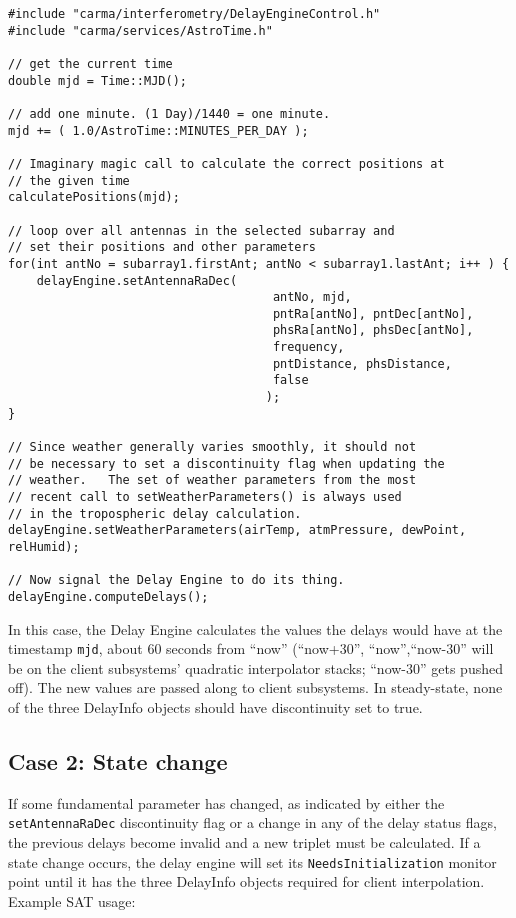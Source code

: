 \documentclass[preprint]{aastex}
\begin{document}
\begin{verbatim}
#include "carma/interferometry/DelayEngineControl.h"
#include "carma/services/AstroTime.h"

// get the current time
double mjd = Time::MJD(); 

// add one minute. (1 Day)/1440 = one minute.
mjd += ( 1.0/AstroTime::MINUTES_PER_DAY );   

// Imaginary magic call to calculate the correct positions at 
// the given time
calculatePositions(mjd);

// loop over all antennas in the selected subarray and
// set their positions and other parameters
for(int antNo = subarray1.firstAnt; antNo < subarray1.lastAnt; i++ ) {
    delayEngine.setAntennaRaDec(
                                     antNo, mjd,
                                     pntRa[antNo], pntDec[antNo],
                                     phsRa[antNo], phsDec[antNo],
                                     frequency, 
                                     pntDistance, phsDistance, 
                                     false
                                    );
}

// Since weather generally varies smoothly, it should not
// be necessary to set a discontinuity flag when updating the
// weather.   The set of weather parameters from the most
// recent call to setWeatherParameters() is always used
// in the tropospheric delay calculation.
delayEngine.setWeatherParameters(airTemp, atmPressure, dewPoint, relHumid);

// Now signal the Delay Engine to do its thing.
delayEngine.computeDelays();
\end{verbatim}

In this case, the Delay Engine calculates the values the delays 
would have at the timestamp {\tt mjd}, about 60 seconds from ``now''
(``now+30'', ``now'',``now-30'' will be
on the client subsystems' quadratic interpolator stacks; 
``now-30'' gets pushed off).
The new values are passed along to client subsystems.
In steady-state, none of the three DelayInfo objects should have
discontinuity set to true.

\subsection{Case 2: State change}
If some fundamental parameter has changed, as indicated by either
the {\tt setAntennaRaDec} discontinuity flag or a change in
any of the delay status flags, the previous delays become invalid
and a new triplet must be calculated.  If a state change occurs,
the delay engine will set its {\tt NeedsInitialization} monitor
point until it has the three DelayInfo objects required for
client interpolation.
Example SAT usage:
\end{document}
